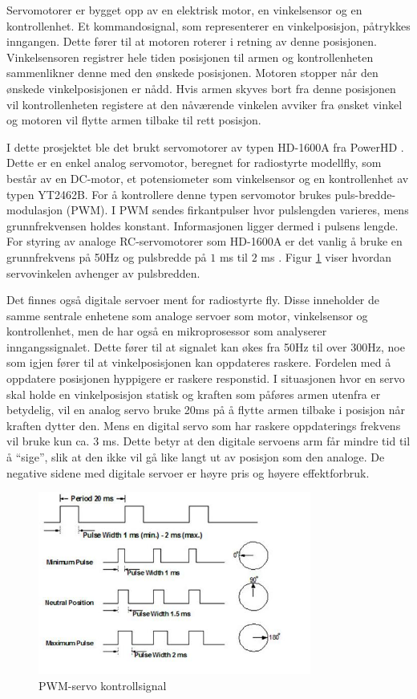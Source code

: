Servomotorer er bygget opp av en elektrisk motor, en vinkelsensor og en kontrollenhet. Et kommandosignal, som representerer en vinkelposisjon, påtrykkes inngangen. Dette fører til at motoren roterer i retning av denne posisjonen. Vinkelsensoren registrer hele tiden posisjonen til armen og kontrollenheten sammenlikner denne med den ønskede posisjonen. Motoren stopper når den ønskede vinkelposisjonen er nådd. Hvis armen skyves bort fra denne posisjonen vil kontrollenheten registere at den nåværende vinkelen avviker fra ønsket vinkel og motoren vil flytte armen tilbake til rett posisjon. 

I dette prosjektet ble det brukt servomotorer av typen HD-1600A fra PowerHD \cite{PowerHD}. Dette er en enkel analog servomotor, beregnet for radiostyrte modellfly, som består av en DC-motor, et potensiometer som vinkelsensor og en kontrollenhet av typen YT2462B. For å kontrollere denne typen servomotor brukes puls-bredde-modulasjon (PWM). I PWM sendes firkantpulser hvor pulslengden varieres, mens grunnfrekvensen holdes konstant. Informasjonen ligger dermed i pulsens lengde. For styring av analoge RC-servomotorer som HD-1600A er det vanlig å bruke en grunnfrekvens på 50Hz og pulsbredde på $1$ ms til $2$ ms \cite{PCBheaven}. Figur \ref{fig:PWM} viser hvordan servovinkelen avhenger av pulsbredden.

Det finnes også digitale servoer ment for radiostyrte fly. Disse inneholder de samme sentrale enhetene som analoge servoer som motor, vinkelsensor og kontrollenhet, men de har også en mikroprosessor som analyserer inngangssignalet. Dette fører til at signalet kan økes fra 50Hz til over 300Hz, noe som igjen fører til at vinkelposisjonen kan oppdateres raskere. Fordelen med å oppdatere posisjonen hyppigere er raskere responstid. I situasjonen hvor en servo skal holde en vinkelposisjon statisk og kraften som påføres armen utenfra er betydelig, vil en analog servo bruke 20ms på å flytte armen tilbake i posisjon når kraften dytter den. Mens en digital servo som har raskere oppdaterings frekvens vil bruke kun ca. $3$ ms. Dette betyr at den digitale servoens arm får mindre tid til å ``sige'', slik at den ikke vil gå like langt ut av posisjon som den analoge. De negative sidene med digitale servoer er høyre pris og høyere effektforbruk.    

\begin{figure}[H]
\centering
\includegraphics[width=0.8\textwidth]{img/pwm_servo.jpg}
\caption{PWM-servo kontrollsignal \cite{PWM}}
\label{fig:PWM}
\end{figure}   

